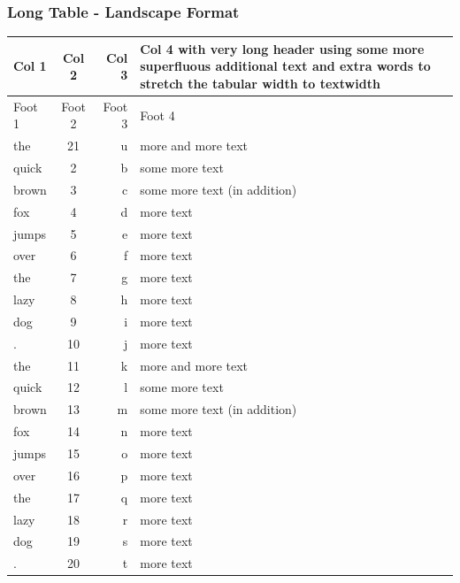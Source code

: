 \documentclass{pharmrep}
\begin{document}
\subsubsection{Long Table - Landscape Format}
\label{tab:longtableLandscape}
\begin{tabularx}{\textwidth}{lcrX}
   \toprule
   \textbf{Col 1} &  \textbf{Col 2} &  \textbf{Col 3} & \textbf{Col 4 with very long header using some more
      superfluous additional text and extra words to stretch the tabular width to textwidth} \\
   \midrule\endhead
   \midrule
   Foot 1 & Foot 2 & Foot 3 & Foot 4 \\\bottomrule\endfoot
   the   & 21    & u     & more and more text \\ \midrule
   quick & 2     & b     & some more text \\ \midrule
   brown & 3     & c     & some more text (in addition) \\ \midrule
   fox   & 4     & d     & more text \\ \midrule
   jumps & 5     & e     & more text \\ \midrule
   over  & 6     & f     & more text \\ \midrule
   the   & 7     & g     & more text \\ \midrule
   lazy  & 8     & h     & more text \\ \midrule
   dog   & 9     & i     & more text \\ \midrule
   .     & 10    & j     & more text \\ \midrule
   the   & 11    & k     & more and more text \\ \midrule
   quick & 12    & l     & some more text \\ \midrule
   brown & 13    & m     & some more text (in addition) \\ \midrule
   fox   & 14    & n     & more text \\ \midrule
   jumps & 15    & o     & more text \\ \midrule
   over  & 16    & p     & more text \\ \midrule
   the   & 17    & q     & more text \\ \midrule
   lazy  & 18    & r     & more text \\ \midrule
   dog   & 19    & s     & more text \\ \midrule
   .     & 20    & t     & more text \\ \midrule

\end{tabularx}
\end{document}
